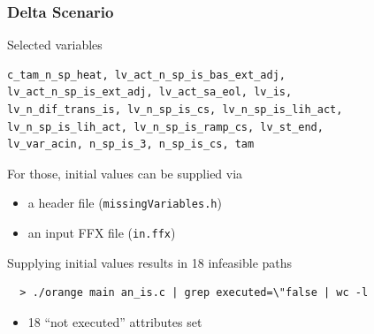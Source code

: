 \documentclass{beamer}
\begin{document}
\begin{frame}[fragile]
  \frametitle{Delta Scenario}

  \bigskip
  Selected variables
  {\tiny 
  \begin{verbatim}
c_tam_n_sp_heat, lv_act_n_sp_is_bas_ext_adj,
lv_act_n_sp_is_ext_adj, lv_act_sa_eol, lv_is,
lv_n_dif_trans_is, lv_n_sp_is_cs, lv_n_sp_is_lih_act,
lv_n_sp_is_lih_act, lv_n_sp_is_ramp_cs, lv_st_end,
lv_var_acin, n_sp_is_3, n_sp_is_cs, tam
  \end{verbatim}
  }

  \bigskip
  For those, initial values can be supplied via
  \begin{itemize}
    \item a header file ({\tt missingVariables.h})
    \item an input FFX file ({\tt in.ffx})
  \end{itemize}

  \bigskip
  Supplying initial values results in 18 infeasible paths
  {\small
  \begin{verbatim}
  > ./orange main an_is.c | grep executed=\"false | wc -l
  \end{verbatim}
  }
  \vspace{-.4cm}
  \begin{itemize}
    \item 18 ``not executed'' attributes set
  \end{itemize}
\end{frame}
\end{document}
